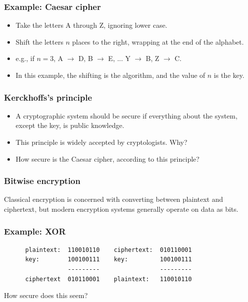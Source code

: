\documentclass[10pt]{beamer}
\begin{document}
\begin{frame}
  \frametitle{Example: Caesar cipher}

 \begin{itemize}
  \item Take the letters A through Z, ignoring lower case.
  \item Shift the letters $n$ places to the right, wrapping at the end of
        the alphabet.
  \item e.g., if $n = 3$, A $\rightarrow$ D, B $\rightarrow$ E, ...
        Y $\rightarrow$ B, Z $\rightarrow$ C.
  \item In this example, the shifting is the algorithm, and the value
        of $n$ is the key.
  \end{itemize}
\end{frame}


\begin{frame}
  \frametitle{Kerckhoffs's principle}

 \begin{itemize}
      \item A cryptographic system should be secure if everything about the system, except the key, is public knowledge.

      \item This principle is widely accepted by cryptologists.  Why?

      \item How secure is the Caesar cipher, according to this principle?

  \end{itemize}
\end{frame}



\begin{frame}
  \frametitle{Bitwise encryption}

   Classical encryption is concerned with converting between plaintext
   and ciphertext, but modern encryption systems generally operate on 
   data as bits.
\end{frame}

\begin{frame}[fragile]
  \frametitle{Example: XOR}

  \begin{verbatim}
      plaintext:  110010110    ciphertext:  010110001
      key:        100100111    key:         100100111
                  ---------                 ---------
      ciphertext  010110001    plaintext:   110010110
  \end{verbatim}

How secure does this seem?
\end{frame}
\end{document}
